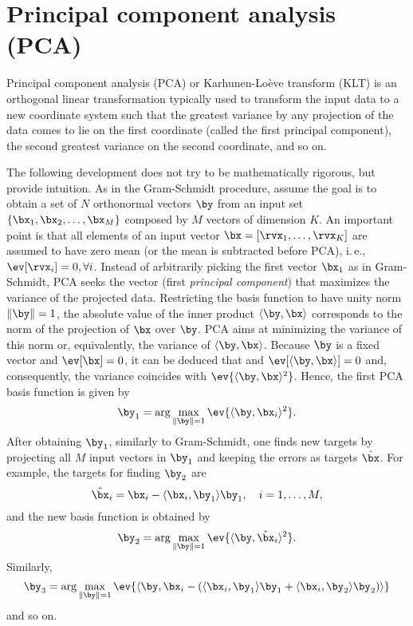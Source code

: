 \section{Principal component analysis (PCA)}

Principal component analysis (PCA) or Karhunen-Lo\`eve transform (KLT) is an orthogonal linear transformation typically used to transform the input data to a new coordinate system such that the greatest variance by any projection of the data comes to lie on the first coordinate (called the first principal component), the second greatest variance on the second coordinate, and so on.

The following development does not try to be mathematically rigorous, but provide intuition. As in the Gram-Schmidt procedure, assume the goal is to obtain a set of $N$ orthonormal vectors $\by$ from an input set $\{\bx_1,\bx_2,\ldots,\bx_M\}$ composed by $M$ vectors of dimension $K$. An important point is that all elements of an input vector $\bx=[\rvx_1,\ldots,\rvx_K]$ are assumed to have zero mean (or the mean is subtracted before PCA), i.\,e., $\ev[\rvx_i]=0, \forall i$. Instead of arbitrarily picking the first vector $\bx_1$ as in Gram-Schmidt, PCA seeks the vector (first \emph{principal component}) that maximizes the variance of the projected data. Restricting the basis function to have unity norm $\lVert\by\rVert=1$, the absolute value of the inner product $\langle\by, \bx\rangle$ corresponds to the norm of the projection of $\bx$ over $\by$. PCA aims at minimizing the variance of this norm or, equivalently, the variance of $\langle\by, \bx\rangle$. Because $\by$ is a fixed vector and $\ev[\bx]=0$, it can be deduced that and $\ev[\langle\by,\bx\rangle]=0$ and, consequently, the variance coincides with $\ev \{\langle\by, \bx\rangle^2\}$. Hence, the first PCA basis function is given by
\[
\by_1 = \arg \max_{\lVert\by\rVert=1} \ev \{\langle\by, \bx_i\rangle^2\}.
\]
After obtaining $\by_1$, similarly to Gram-Schmidt, one finds new targets by projecting all $M$ input vectors in $\by_1$ and keeping the errors as targets $\hat \bx$. For example, the targets for finding $\by_2$ are
\[
\hat \bx_{i} = \bx_i - \langle\bx_i,\by_1\rangle \by_1,\quad i=1,\ldots,M,
\]
and the new basis function is obtained by
\[
\by_2 = \arg \max_{\lVert\by\rVert=1} \ev \{\langle\by, \hat \bx_i\rangle^2\}.
\]
Similarly,
\[
\by_3 = \arg \max_{\lVert\by\rVert=1} \ev \{\langle\by, \bx_i - (\langle\bx_i,\by_1\rangle \by_1 + \langle\bx_i,\by_2\rangle \by_2)\rangle\}
\]
and so on.

